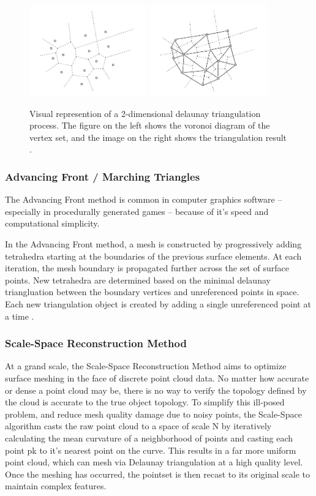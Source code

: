 \documentclass[12pt]{drexelthesis}
\let\Oldsubsubsection\subsubsection
\renewcommand{\subsubsection}{\FloatBarrier\Oldsubsubsection}
\begin{document}
\begin{figure}[!ht]
	\centering
		\includegraphics[width=2in]{delaunayTriangulation/voronoi.jpg}
		\includegraphics[width=2in]{delaunayTriangulation/delaunay.jpg}
	\caption[2D delaunay triangulation]{\centering Visual represention of a 2-dimensional delaunay triangulation process. The figure on the left shows the voronoi diagram of the vertex set, and the image on the right shows the triangulation result \cite{RN65}.}
\end{figure}

\subsubsection{Advancing Front / Marching Triangles}
The Advancing Front method is common in computer graphics software – especially in procedurally generated games – because of it’s speed and computational simplicity.

In the Advancing Front method, a mesh is constructed by progressively adding tetrahedra starting at the boundaries of the previous surface elements. At each iteration, the mesh boundary is propagated further across the set of surface points. New tetrahedra are determined based on the minimal delaunay triangluation between the boundary vertices and unreferenced points in space. Each new triangulation object is created by adding a single unreferenced point at a time \cite{RN66}.

\subsubsection{Scale-Space Reconstruction Method}
At a grand scale, the Scale-Space Reconstruction Method aims to optimize surface meshing in the face of discrete point cloud data. No matter how accurate or dense a point cloud may be, there is no way to verify the topology defined by the cloud is accurate to the true object topology. To simplify this ill-posed problem, and reduce mesh quality damage due to noisy points, the Scale-Space algorithm casts the raw point cloud to a space of scale N by iteratively calculating the mean curvature of a neighborhood of points and casting each point pk to it’s nearest point on the curve. This results in a far more uniform point cloud, which can mesh via Delaunay triangulation at a high quality level. Once the meshing has occurred, the pointset is then recast to its original scale to maintain complex features. 
\end{document}
